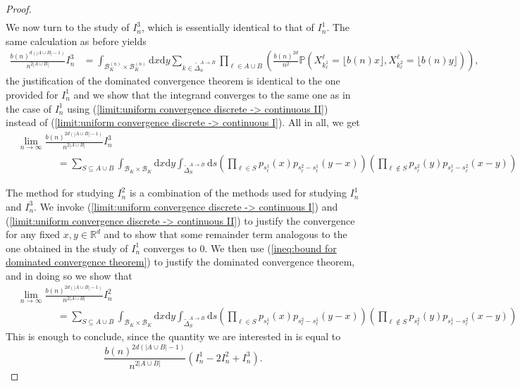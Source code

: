 \documentclass[12pt]{article}
\newcommand{\RR}{\mathbb R}
\newcommand{\PP}{\mathbb P}
\newcommand{\1}{\mathds{1}}
\renewcommand{\d}{\mathrm d}
\numberwithin{equation}{section}
\begin{document}
\begin{proof}
\begin{align*}
    \end{align*}
    We now turn to the study of $I_n^3$, which is essentially identical to that of $I_n^1$. The same calculation as before yields
    \begin{align*}
        \frac{b(n)^{d(|A\cup B|-1)}}{n^{2|A\cup B|}}I_n^3&=\int_{\mathcal B_K^{(n)}\times\mathcal B_K^{(n)}}\d x\d y\sum_{k\in\widetilde\Delta_n^{A\rightarrow B}}\prod_{\ell\in A\cup B}\left(\frac{b(n)^{2d}}{n^2}\PP\left(X_{k_\ell^1}^{\ell}=\lfloor b(n)x\rfloor,X_{k_\ell^2}^{\ell}=\lfloor b(n)y\rfloor\right)\right),
    \end{align*}
    the justification of the dominated convergence theorem is identical to the one provided for $I_n^1$ and we show that the integrand converges to the same one as in the case of $I_n^1$ using (\ref{limit:uniform convergence discrete -> continuous II}) instead of (\ref{limit:uniform convergence discrete -> continuous I}). All in all, we get
    \begin{align*}
        &\lim_{n\rightarrow\infty}\frac{b(n)^{2d(|A\cup B|-1)}}{n^{2|A\cup B|}}I_n^3\\
        &\hspace{4em}=\sum_{S\subseteq A\cup B}\int_{\mathcal B_K\times\mathcal B_K}\d x\d y\int_{\widetilde\Delta_S^{A\rightarrow B}}\d s\left(\prod_{\ell\in S}p_{s_\ell^1}(x) p_{s_\ell^2-s_\ell^1}(y-x)\right)\left(\prod_{\ell\notin S}p_{s_\ell^2}(y) p_{s_\ell^1-s_\ell^2}(x-y)\right)
    \end{align*}

    The method for studying $I_n^2$ is a combination of the methods used for studying $I_n^1$ and $I_n^3$. We invoke (\ref{limit:uniform convergence discrete -> continuous I}) and (\ref{limit:uniform convergence discrete -> continuous II}) to justify the convergence for any fixed $x,y\in\RR^d$ and to show that some remainder term analogous to the one obtained in the study of $I_n^1$ converges to $0$. We then use (\ref{ineq:bound for dominated convergence theorem}) to justify the dominated convergence theorem, and in doing so we show that 
    \begin{align*}
        &\lim_{n\rightarrow\infty}\frac{b(n)^{2d(|A\cup B|-1)}}{n^{2|A\cup B|}}I_n^2\\
        &\hspace{4em}=\sum_{S\subseteq A\cup B}\int_{\mathcal B_K\times\mathcal B_K}\d x\d y\int_{\widetilde\Delta_S^{A\rightarrow B}}\d s\left(\prod_{\ell\in S}p_{s_\ell^1}(x) p_{s_\ell^2-s_\ell^1}(y-x)\right)\left(\prod_{\ell\notin S}p_{s_\ell^2}(y) p_{s_\ell^1-s_\ell^2}(x-y)\right)
    \end{align*}
     This is enough to conclude, since the quantity we are interested in is equal to
     \begin{equation*}
         \frac{b(n)^{2d(|A\cup B|-1)}}{n^{2|A\cup B|}}\left(I_n^1-2I_n^2+I_n^3\right).
     \end{equation*}

\end{proof}
\end{document}
